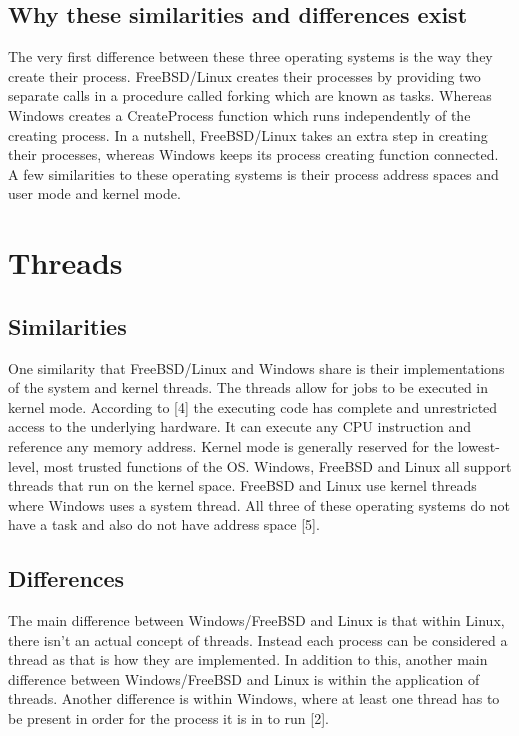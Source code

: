 \documentclass[onecolumn, draftclsnofoot,10pt, compsoc]{IEEEtran}
\begin{document}
\subsection{Why these similarities and differences exist}

The very first difference between these three operating systems is the way they create their process. FreeBSD/Linux creates their processes by providing two separate calls in a procedure called forking which are known as tasks. Whereas Windows creates a CreateProcess function which runs independently of the creating process. In a nutshell, FreeBSD/Linux takes an extra step in creating their processes, whereas Windows keeps its process creating function connected. A few similarities to these operating systems is their process address spaces and user mode and kernel mode.

\section{Threads}

\subsection{Similarities}

One similarity that FreeBSD/Linux and Windows share is their implementations of the system and kernel threads. The threads allow for jobs to be executed in kernel mode. According to [4] the executing code has complete and unrestricted access to the underlying hardware. It can execute any CPU instruction and reference any memory address. Kernel mode is generally reserved for the lowest-level, most trusted functions of the OS. Windows, FreeBSD and Linux all support threads that run on the kernel space. FreeBSD and Linux use kernel threads where Windows uses a system thread. All three of these operating systems do not have a task and also do not have address space [5].


\subsection{Differences}
The main difference between Windows/FreeBSD and Linux is that within Linux, there isn't an actual concept of threads. Instead each process can be considered a thread as that is how they are implemented. In addition to this, another main difference between Windows/FreeBSD and Linux is within the application of threads. Another difference is within Windows, where at least one thread has to be present in order for the process it is in to run [2].
\end{document}
